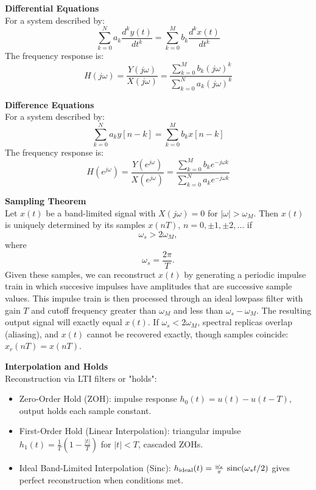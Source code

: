 \documentclass{article}
\begin{document}
\begin{multicols}{2}
    \noindent\textbf{Differential Equations} \\
    For a system described by:
    \[
        \sum_{k=0}^{N} a_k \frac{d^k y(t)}{dt^k} = \sum_{k=0}^{M} b_k \frac{d^k x(t)}{dt^k}
    \]
    The frequency response is:
    \[ \label{eq:diff_eq_Hjw}
        H(j\omega) = \frac{Y(j\omega)}{X(j\omega)} = \frac{\sum_{k=0}^{M} b_k (j\omega)^k}{\sum_{k=0}^{N} a_k (j\omega)^k}
    \]

    \noindent\textbf{Difference Equations} \\
    For a system described by:
    \[
        \sum_{k=0}^{N} a_k y[n-k] = \sum_{k=0}^{M} b_k x[n-k]
    \]
    The frequency response is:
    \[ \label{eq:diff_eq_Hejomega}
        H(e^{j\omega}) = \frac{Y(e^{j\omega})}{X(e^{j\omega})} = \frac{\sum_{k=0}^{M} b_k e^{-j\omega k}}{\sum_{k=0}^{N} a_k e^{-j\omega k}}
    \]

    \noindent\textbf{Sampling Theorem} \\
    Let $x(t)$ be a band-limited signal with
    $X(j\omega) = 0$ for $|\omega| > \omega_M$.
    Then $x(t)$ is uniquely determined by its samples
    $x(nT)$, $n = 0, \pm 1, \pm 2, \dots$ if
    \begin{equation*}
        \omega_s > 2 \omega_M,
    \end{equation*}
    where
    \begin{equation*}
        \omega_s = \frac{2\pi}{T}.
    \end{equation*}
    Given these samples, we can reconstruct
    $x(t)$ by generating a periodic impulse
    train in which succesive impulses have amplitudes that are
    successive sample values. This impulse train is
    then processed through an ideal lowpass filter
    with gain $T$ and cutoff frequency greater than $\omega_M$ and
    less than $\omega_s - \omega_M$.
    The resulting output signal will exactly equal $x(t)$.
    If $\omega_s<2\omega_M$, spectral replicas overlap (aliasing),
    and $x(t)$ cannot be recovered exactly, though samples coincide:
    $x_r(nT)=x(nT)$.

    \noindent\textbf{Interpolation and Holds}\\
    Reconstruction via LTI filters or "holds":
    \begin{itemize}
        \item Zero-Order Hold (ZOH): impulse response $h_0(t)=u(t)-u(t-T)$, output holds each sample constant.
        \item First-Order Hold (Linear Interpolation): triangular impulse $h_1(t)=\frac{1}{T}(1-\frac{|t|}{T})$ for $|t|<T$, cascaded ZOHs.
        \item Ideal Band-Limited Interpolation (Sinc): $h_{\rm ideal}(t)=\frac{\omega_s}{\pi}~\mathrm{sinc}(\omega_s t/2)$ gives perfect reconstruction when conditions met.
    \end{itemize}


\end{multicols}
\end{document}

